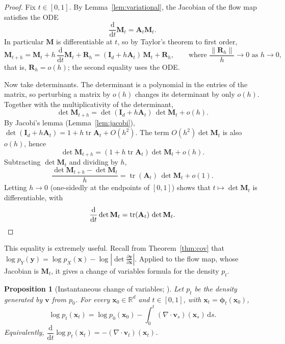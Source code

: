 \documentclass[11pt,a4paper]{article}
\numberwithin{equation}{section}     %
\theoremstyle{plain}        %
\newtheorem{proposition}[theorem]{Proposition}
\theoremstyle{definition}   %
\theoremstyle{remark}       %
\begin{document}
\begin{proof}
Fix $t\in[0,1]$. By Lemma~\ref{lem:variational}, the Jacobian of the flow map satisfies the ODE
\[
\frac{\mathrm{d}}{\mathrm{d}t}\mathbf{M}_t=\mathbf{A}_t\mathbf{M}_t .
\]
In particular $\mathbf{M}$ is differentiable at $t$, so by Taylor's theorem to first order,
\[
\mathbf{M}_{t+h}=\mathbf{M}_t+h\,\frac{\mathrm{d}}{\mathrm{d}t}\mathbf{M}_t+\mathbf{R}_h=(\mathbf{I}_d+h\mathbf{A}_t)\,\mathbf{M}_t+\mathbf{R}_h,
\qquad\text{where }\frac{\|\mathbf{R}_h\|}{h}\to0\text{ as }h\to0,
\]
that is, $\mathbf{R}_h=o(h)$; the second equality uses the ODE.

Now take determinants. The determinant is a polynomial in the entries of the matrix, so perturbing a matrix by $o(h)$ changes its determinant by only $o(h)$. Together with the multiplicativity of the determinant,
\[
\det\mathbf{M}_{t+h}=\det(\mathbf{I}_d+h\mathbf{A}_t)\,\det\mathbf{M}_t+o(h).
\]
By Jacobi's lemma (Lemma~\ref{lem:jacobi}), $\det(\mathbf{I}_d+h\mathbf{A}_t)=1+h\operatorname{tr}\mathbf{A}_t+O(h^2)$. The term $O(h^2)\det\mathbf{M}_t$ is also $o(h)$, hence
\[
\det\mathbf{M}_{t+h}=\left(1+h\operatorname{tr}\mathbf{A}_t\right)\det\mathbf{M}_t+o(h).
\]
Subtracting $\det\mathbf{M}_t$ and dividing by $h$,
\[
\frac{\det\mathbf{M}_{t+h}-\det\mathbf{M}_t}{h}=\operatorname{tr}(\mathbf{A}_t)\,\det\mathbf{M}_t+o(1).
\]
Letting $h\to0$ (one-sidedly at the endpoints of $[0,1]$) shows that $t\mapsto\det\mathbf{M}_t$ is differentiable, with
\[
\frac{\mathrm{d}}{\mathrm{d}t}\det\mathbf{M}_t=\operatorname{tr}(\mathbf{A}_t)\,\det\mathbf{M}_t . \qedhere
\]
\end{proof}

This equality is extremely useful. Recall from Theorem~\ref{thm:cov} that $\log p_Y(\mathbf{y})=\log p_X(\mathbf{x})-\log\left|\det\frac{\partial\mathbf{y}}{\partial\mathbf{x}}\right|$. Applied to the flow map, whose Jacobian is $\mathbf{M}_t$, it gives a change of variables formula for the density $p_t$.

\begin{proposition}[Instantaneous change of variables; \citealp{chen2018}]\label{prop:icov}
Let $p_t$ be the density generated by $\mathbf{v}$ from $p_0$. For every $\mathbf{x}_0\in\mathbb{R}^d$ and $t\in[0,1]$, with $\mathbf{x}_t=\boldsymbol{\phi}_t(\mathbf{x}_0)$,
\[
\log p_t(\mathbf{x}_t)=\log p_0(\mathbf{x}_0)-\int_0^t(\nabla\cdot\mathbf{v}_s)(\mathbf{x}_s)\,\mathrm{d}s .
\]
Equivalently, $\dfrac{\mathrm{d}}{\mathrm{d}t}\log p_t(\mathbf{x}_t)=-(\nabla\cdot\mathbf{v}_t)(\mathbf{x}_t)$.
\end{proposition}
\end{document}
